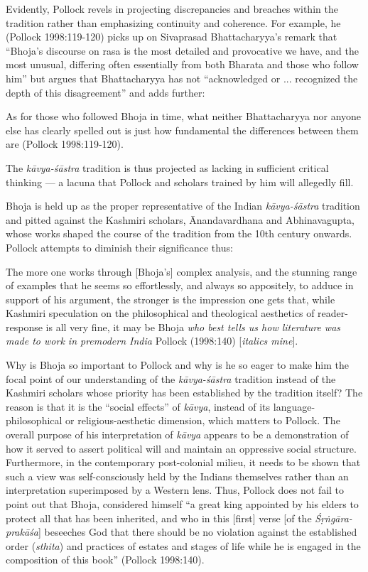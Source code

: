 Evidently, Pollock revels in projecting discrepancies and breaches with\-in the tradition rather than emphasizing continuity and coherence. For example, he (Pollock 1998:119-120) picks up on Sivaprasad Bhattacharyya's remark that ``Bhoja's discourse on rasa is the most detailed and provocative we have, and the most unusual, differing often essentially from both Bharata and those who follow him'' but argues that Bhattacharyya has not ``acknowledged or ... recognized the depth of this disagreement'' and adds further:

\begin{myquote}
As for those who followed Bhoja in time, what neither Bhattacharyya nor anyone else has clearly spelled out is just how fundamental the differences between them are 
\hfill (Pollock 1998:119-120).  
\end{myquote}

The \textsl{kāvya-śāstra} tradition is thus projected as lacking in sufficient critical thinking --- a lacuna that Pollock and scholars trained by him will allegedly fill.

Bhoja is held up as the proper representative of the Indian \textsl{kāvya-śāstra} tradition and pitted against the Kashmiri scholars, Ānandavardhana and Abhinavagupta, whose works shaped the course of the tradition from the 10th century onwards. Pollock attempts to diminish their significance thus:

\begin{myquote}
The more one works through [Bhoja's] complex analysis, and the stunning range of examples that he seems so effortlessly, and always so appositely, to adduce in support of his argument, the stronger is the impression one gets that, while Kashmiri speculation on the philosophical and theological aesthetics of reader-response is all very fine, it may be Bhoja \textsl{who best tells us how literature was made to work in premodern India} 
\hfill Pollock (1998:140) [\textsl{italics mine}].
\end{myquote}

Why is Bhoja so important to Pollock and why is he so eager to make him the focal point of our understanding of the \textsl{kāvya-śāstra} tradition instead of the Kashmiri scholars whose priority has been established by the tradition itself? The reason is that it is the ``social effects'' of \textsl{kāvya}, instead of its language-philosophical or religious-aesthetic dimension, which matters to Pollock. The overall purpose of his interpretation of \textsl{kāvya} appears to be a demonstration of how it served to assert political will and maintain an oppressive social structure. Furthermore, in the contemporary post-colonial milieu, it needs to be shown that such a view was self-consciously held by the Indians themselves rather than an interpretation superimposed by a Western lens. Thus, Pollock does not fail to point out that Bhoja, considered himself ``a great king appointed by his elders to protect all that has been inherited, and who in this [first] verse [of the \textsl{Śṛṅgāra-prakāśa}] beseeches God that there should be no violation against the established order (\textsl{sthita}) and practices of estates and stages of life while he is engaged in the composition of this book'' (Pollock 1998:140).

